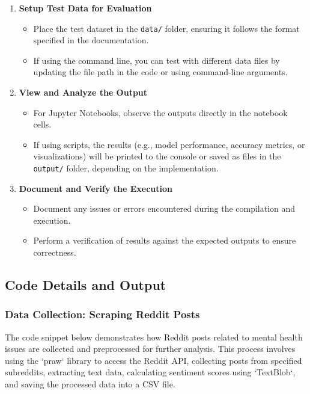 \begin{enumerate}
    \item \textbf{Setup Test Data for Evaluation}
    \begin{itemize}
        \item Place the test dataset in the \texttt{data/} folder, ensuring it follows the format specified in the documentation.
        \item If using the command line, you can test with different data files by updating the file path in the code or using command-line arguments.
    \end{itemize}

    \item \textbf{View and Analyze the Output}
    \begin{itemize}
        \item For Jupyter Notebooks, observe the outputs directly in the notebook cells.
        \item If using scripts, the results (e.g., model performance, accuracy metrics, or visualizations) will be printed to the console or saved as files in the \texttt{output/} folder, depending on the implementation.
    \end{itemize}

    \item \textbf{Document and Verify the Execution}
    \begin{itemize}
        \item Document any issues or errors encountered during the compilation and execution.
        \item Perform a verification of results against the expected outputs to ensure correctness.
    \end{itemize}
\end{enumerate}

\subsection{Code Details and Output}

\subsubsection{Data Collection: Scraping Reddit Posts}
\noindent
The code snippet below demonstrates how Reddit posts related to mental health issues are collected and preprocessed for further analysis. This process involves using the `praw` library to access the Reddit API, collecting posts from specified subreddits, extracting text data, calculating sentiment scores using `TextBlob`, and saving the processed data into a CSV file.

